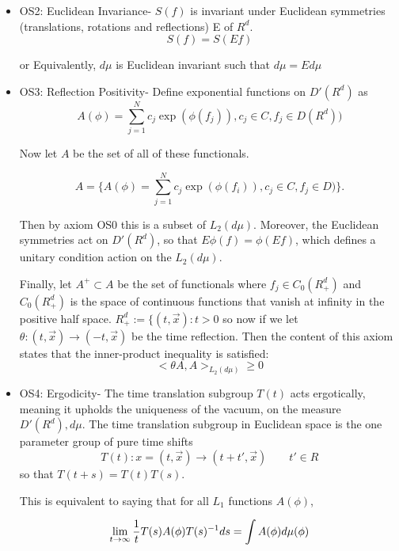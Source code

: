 \documentclass{article}
\begin{document}
\begin{itemize}
    \item OS2: Euclidean Invariance- $S(f)$ is invariant under Euclidean symmetries (translations, rotations and reflections) E of $R^d$.
    \begin{equation}
        S(f)= S(Ef)
    \end{equation}

    or Equivalently, $d\mu$ is Euclidean invariant such that $d\mu = E d\mu$

    \item OS3: Reflection Positivity- Define exponential functions on $D'(R^d)$ as
    \begin{equation}
         A(\phi)= \sum_{j=1}^N c_j \exp (\phi(f_j)), c_j \in C, f_j \in D(R^d))
    \end{equation}

     Now let $A$ be the set of all of these functionals. 

      \begin{equation}
        A = \{ A(\phi)= \sum_{j=1}^N c_j \exp (\phi(f_i)), c_j \in C, f_j \in D)\}.
    \end{equation}
     
     Then by axiom OS0 this is a subset of $L_2(d \mu)$. Moreover, the Euclidean symmetries act on $D'(R^d)$, so that $E \phi(f) = \phi(Ef)$, which defines a unitary condition action on the $L_2(d \mu)$. 

     Finally, let $A^+ \subset  A $ be the set of functionals where $f_j \in C_0(R_{+}^d)$ and $C_0(R_{+}^d)$ is the space of continuous functions that vanish at infinity in the positive half space. $R_+^d := \{ (t, \vec{x}): t > 0$ so now if we let $\theta: (t , \vec{x}) \rightarrow (-t, \vec{x})$ be the time reflection. Then the content of this axiom states that the inner-product inequality is satisfied:  
     \begin{equation}
         < \theta A, A >_{L_2(d \mu)}\geq 0 
     \end{equation}
     
    \item OS4: Ergodicity- The time translation subgroup $T(t)$ acts ergotically, meaning it upholds the uniqueness of the vacuum, on the measure $D'(R^d), d\mu$. The time translation subgroup in Euclidean space is the one parameter group of pure time shifts 
    \begin{equation}
        T(t) : x = (t, \vec{x})\rightarrow (t+ t', \vec{x}) \qquad t'\in R 
    \end{equation}
so that $T(t+s)= T(t) T(s)$. 

This is equivalent to saying that for all $L_{1}$ functions $A(\phi)$, 

\begin{equation}
    \lim_{t \rightarrow \infty} {1 \over t} T(s) A(\phi) T(s)^{-1} ds = \int A (\phi) d \mu(\phi)
\end{equation}

\end{itemize}
\end{document}
